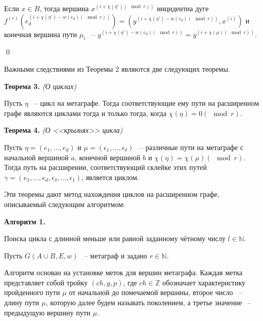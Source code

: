 \documentclass[14pt]{mmcs-article}
\begin{document}
Если $x \in B$, тогда вершина $x^{(i + \chi(\eta')(\mod{r}))}$ инцидентна дуге \\ $f^{(r)}(e_d^{(i + \chi(\eta') - w(e_d) (\mod{r}))}) = (y^{(i + \chi(\eta') - w(e_d) (\mod{r}))}, x^{(i)})$ и конечная вершина пути $\mu_i$ ~-- $y^{(i + \chi(\eta') - w(e_d) (\mod{r}))} = y^{(i + \chi(\mu) (\mod{r}))}$.

\qed

Важными следствиями из Теоремы 2 являются две следующих теоремы.

\textbf{Теорема 3.} \textsl{(О циклах)}

Пусть $\eta$ ~-- цикл на метаграфе. Тогда соответствующие ему пути на расширенном графе являются циклами тогда и только тогда, когда $\chi(\eta) = 0 (\mod{r})$.

\textbf{Теорема 4.} \textsl{(О <<крыльях>> цикла)}

Пусть $\eta = (e_1, ..., e_d)$ и $\mu = (\epsilon_1, ..., \epsilon_{\delta})$ ~-- различные пути на метаграфе с начальной вершиной $a$, конечной вершиной $b$ и $\chi(\eta) = \chi(\mu) (\mod{r})$. Тогда путь на расширении, соответствующий склейке этих путей \\ $\gamma = (e_1, \dots, e_d, \epsilon_{\delta}, \dots, \epsilon_1)$, является циклом.

Эти теоремы дают метод нахождения циклов на расширенном графе, описываемый следующим алгоритмом:



\textbf{Алгоритм 1.}


Поиска цикла с длинной меньше или равной заданному чётному числу $l \in \mathbb{N}$.

Пусть $G(A \cup B, E,w)$ ~-- метаграф и задано $r \in \mathbb{N}$.


Алгоритм основан на установке меток для вершин метаграфа. Каждая метка представляет собой тройку $(ch, g, p)$, где $ch \in \mathbb{Z}$ обозначает характеристику пройденного пути $\mu$ от начальной до помечаемой вершины, второе число ~-- длину пути $\mu$, которую далее будем называть поколением, а третье значение ~-- предыдущую вершину пути $\mu$.
\end{document}
